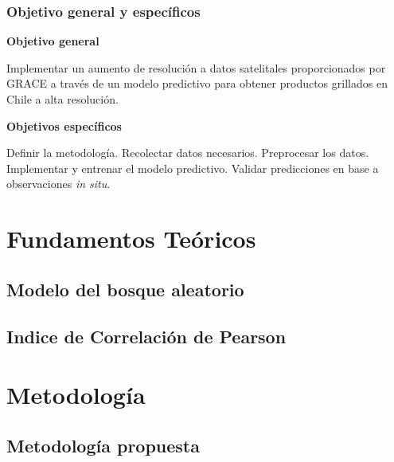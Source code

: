 \documentclass{beamer}
\begin{document}
  \begin{frame}
    \frametitle{Objetivo general y específicos}

    \large\textbf{Objetivo general}
    \begin{outline}
      \1 Implementar un aumento de resolución a datos satelitales proporcionados por GRACE a través de un modelo
      predictivo para obtener productos grillados en Chile a alta resolución.
    \end{outline}

    \large\textbf{Objetivos específicos} 
    \begin{outline}
      \1 Definir la metodología.
      \1 Recolectar datos necesarios.
      \1 Preprocesar los datos.
      \1 Implementar y entrenar el modelo predictivo.
      \1 Validar predicciones en base a observaciones \textit{in situ}.
    \end{outline}

  \end{frame}

  \section{Fundamentos Teóricos}

  \subsection*{Modelo del bosque aleatorio}

  \begin{frame}
    \frametitle{}
  \end{frame}

  \subsection*{Indice de Correlación de Pearson}

  \begin{frame}
    \frametitle{}
  \end{frame}

  \section{Metodología}
  \subsection*{Metodología propuesta}

  \begin{frame}
    \frametitle{}
  \end{frame}
\end{document}
